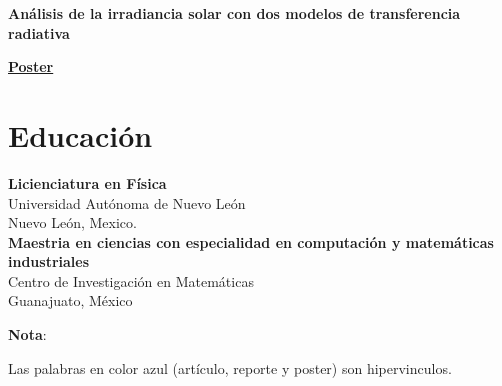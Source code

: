 \documentclass[a3paper]{adcv_color}
\newcommand{\proyect}[5]{\begin{minipage}{1\linewidth}
		\begin{minipage}{1\linewidth}
			\textbf{#1}
		\end{minipage}
	\end{minipage}
	\href{#4}{\textbf{#5}}
	\vspace{0.05cm}\\
}
\begin{document}
\proyect{Análisis de la irradiancia solar con dos modelos de transferencia radiativa}{Agosto 2019}{0}{https://github.com/giovannilopez9808/Documents/raw/master/Posters/2019/CNF/Transferencia\%20radiativa/main.pdf}{Poster}

\section{Educación}

\textbf{Licienciatura en Física} \\
Universidad Autónoma de Nuevo León\\
Nuevo León, Mexico.\\

\textbf{Maestria en ciencias con especialidad en computación y matemáticas industriales}\\
Centro de Investigación en Matemáticas\\
Guanajuato, México
\begin{flushright}
	\changefontsizes{12pt}
	\textbf{Nota}:

	Las palabras en color azul (artículo, reporte y poster) son hipervinculos.
\end{flushright}
\end{document}
